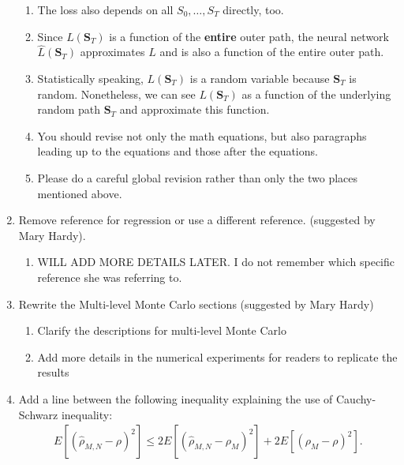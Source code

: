 \documentclass[letterpaper]{article}
\begin{document}
\begin{enumerate}
\begin{enumerate}
        \item The loss also depends on all $S_0,\ldots,S_T$ directly, too.

        \item Since $L(\bm{S}_T)$ is a function of the \textbf{entire} outer path, the neural network $\widehat{L}(\bm{S}_T)$ approximates $L$ and is also a function of the entire outer path.

        \item Statistically speaking, $L(\bm{S}_T)$ is a random variable because $\bm{S}_T$ is random. Nonetheless, we can see $L(\bm{S}_T)$ as a function of the underlying random path $\bm{S}_T$ and approximate this function.

        \item You should revise not only the math equations, but also paragraphs leading up to the equations and those after the equations.

        \item Please do a careful global revision rather than only the two places mentioned above.
        \end{enumerate}

        

        

    \item Remove reference for regression or use a different reference. (suggested by Mary Hardy). 
    \begin{enumerate}
        \item WILL ADD MORE DETAILS LATER. I do not remember which specific reference she was referring to. 
    \end{enumerate}

    \item Rewrite the Multi-level Monte Carlo sections (suggested by Mary Hardy)
    \begin{enumerate}
        \item Clarify the descriptions for multi-level Monte Carlo
        \item Add more details in the numerical experiments for readers to replicate the results
    \end{enumerate}

    \item Add a line between the following inequality explaining the use of Cauchy-Schwarz inequality:
    \begin{align*}
        E[(\hat{\rho}_{M,N}-\rho)^2] \leq 2E[(\hat{\rho}_{M,N}-\rho_M)^2] + 2E[(\rho_M-\rho)^2].
    \end{align*}


\end{enumerate}
\end{document}
